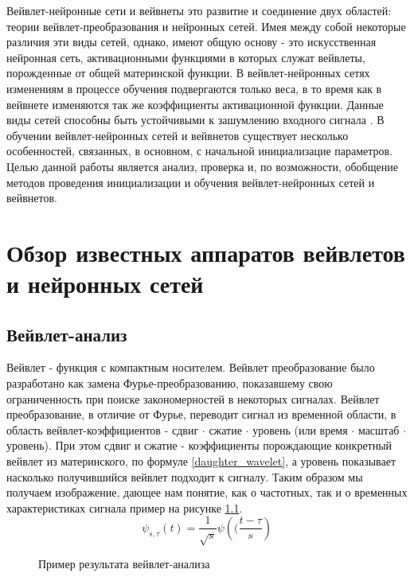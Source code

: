 \documentclass[utf8,usehyperref,14pt]{G7-32}
\begin{document}

\frontmatter %



\tableofcontents


\Introduction
Вейвлет-нейронные сети и вейвнеты это развитие и соединение двух областей: теории вейвлет-преобразования и нейронных сетей. Имея между собой некоторые различия эти виды сетей, однако, имеют общую основу - это искусственная нейронная сеть, активационными функциями в которых служат вейвлеты, порожденные от общей материнской функции. В вейвлет-нейронных сетях изменениям в процессе обучения подвергаются только веса, в то время как в вейвнете изменяются так же коэффициенты активационной функции. Данные виды сетей способны быть устойчивыми к зашумлению входного сигнала \cite{Veitch}. В обучении вейвлет-нейронных сетей и вейвнетов существует несколько особенностей, связанных, в основном, с начальной инициализацие параметров. Целью данной работы является анализ, проверка и, по возможности, обобщение методов проведения инициализации и обучения вейвлет-нейронных сетей и вейвнетов.

\mainmatter %
\chapter{Обзор известных аппаратов вейвлетов и нейронных сетей}
\section{Вейвлет-анализ}
Вейвлет - функция с компактным носителем. Вейвлет преобразование было разработано как замена Фурье-преобразованию, показавшему свою ограниченность при поиске закономерностей в некоторых сигналах. Вейвлет преобразование, в отличие от Фурье, переводит сигнал из временной области, в область вейвлет-коэффициентов - сдвиг $ \cdot $ сжатие $ \cdot $ уровень (или время $ \cdot $ масштаб $ \cdot $ уровень). При этом сдвиг и сжатие - коэффициенты порождающие конкретный вейвлет из материнского, по формуле \eqref{daughter_wavelet}, а уровень показывает насколько получившийся вейвлет подходит к сигналу. Таким образом мы получаем изображение, дающее нам понятие, как о частотных, так и о временных характеристиках сигнала пример на рисунке \ref{gauss_cwt}.
\begin{equation}
\psi_{s,\tau}(t) = \frac{1}{\sqrt{s}} \psi \left(( \frac{t-\tau}{s} \right)
\label{daughter_wavelet}
\end{equation}
\begin{figure}[H]
  \caption{Пример результата вейвлет-анализа}\label{gauss_cwt}
\end{figure}
 
\end{document}
